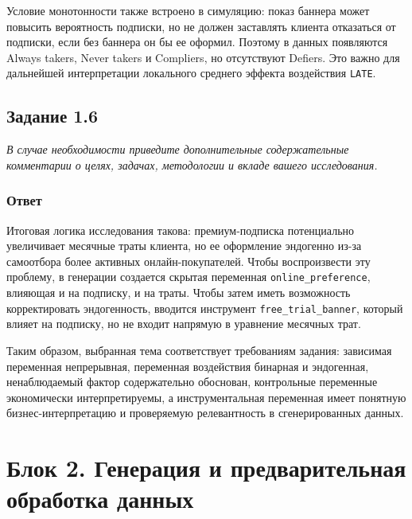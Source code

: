\documentclass[11pt]{article}
\newenvironment{tasktext}
      {\begin{tcolorbox}[breakable, colback=black!3, colframe=black!28,
        boxrule=0.4pt, arc=1.5mm, left=7pt, right=7pt, top=5pt, bottom=5pt,
        before skip=0.35em, after skip=0.75em]\itshape}
      {\end{tcolorbox}}
\begin{document}
Условие монотонности также встроено в симуляцию: показ баннера может
повысить вероятность подписки, но не должен заставлять клиента
отказаться от подписки, если без баннера он бы ее оформил. Поэтому в
данных появляются Always takers, Never takers и Compliers, но
отсутствуют Defiers. Это важно для дальнейшей интерпретации локального
среднего эффекта воздействия \texttt{LATE}.

\subsection{Задание 1.6}\label{ux437ux430ux434ux430ux43dux438ux435-1.6}

\begin{tasktext}
В случае необходимости приведите дополнительные содержательные
комментарии о целях, задачах, методологии и вкладе вашего исследования.
\end{tasktext}

\subsubsection{Ответ}\label{ux43eux442ux432ux435ux442-5}

Итоговая логика исследования такова: премиум-подписка потенциально
увеличивает месячные траты клиента, но ее оформление эндогенно из-за
самоотбора более активных онлайн-покупателей. Чтобы воспроизвести эту
проблему, в генерации создается скрытая переменная
\texttt{online\_preference}, влияющая и на подписку, и на траты. Чтобы
затем иметь возможность корректировать эндогенность, вводится инструмент
\texttt{free\_trial\_banner}, который влияет на подписку, но не входит
напрямую в уравнение месячных трат.

Таким образом, выбранная тема соответствует требованиям задания:
зависимая переменная непрерывная, переменная воздействия бинарная и
эндогенная, ненаблюдаемый фактор содержательно обоснован, контрольные
переменные экономически интерпретируемы, а инструментальная переменная
имеет понятную бизнес-интерпретацию и проверяемую релевантность в
сгенерированных данных.

    \section{Блок 2. Генерация и предварительная обработка
данных}\label{ux431ux43bux43eux43a-2.-ux433ux435ux43dux435ux440ux430ux446ux438ux44f-ux438-ux43fux440ux435ux434ux432ux430ux440ux438ux442ux435ux43bux44cux43dux430ux44f-ux43eux431ux440ux430ux431ux43eux442ux43aux430-ux434ux430ux43dux43dux44bux445}
\end{document}
